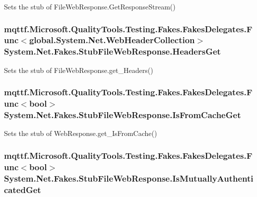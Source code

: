 Sets the stub of File\-Web\-Response.\-Get\-Response\-Stream()

\hypertarget{class_system_1_1_net_1_1_fakes_1_1_stub_file_web_response_a59b9b69af09e642aa18770bd201d79e0}{
\subsubsection[{Headers\-Get}]{\setlength{\rightskip}{0pt plus 5cm}mqttf.\-Microsoft.\-Quality\-Tools.\-Testing.\-Fakes.\-Fakes\-Delegates.\-Func$<$global.\-System.\-Net.\-Web\-Header\-Collection$>$ System.\-Net.\-Fakes.\-Stub\-File\-Web\-Response.\-Headers\-Get}}\label{class_system_1_1_net_1_1_fakes_1_1_stub_file_web_response_a59b9b69af09e642aa18770bd201d79e0}


Sets the stub of File\-Web\-Response.\-get\-\_\-\-Headers()

\hypertarget{class_system_1_1_net_1_1_fakes_1_1_stub_file_web_response_ae37937d3e34b41303d42dc02c9da123b}{
\subsubsection[{Is\-From\-Cache\-Get}]{\setlength{\rightskip}{0pt plus 5cm}mqttf.\-Microsoft.\-Quality\-Tools.\-Testing.\-Fakes.\-Fakes\-Delegates.\-Func$<$bool$>$ System.\-Net.\-Fakes.\-Stub\-File\-Web\-Response.\-Is\-From\-Cache\-Get}}\label{class_system_1_1_net_1_1_fakes_1_1_stub_file_web_response_ae37937d3e34b41303d42dc02c9da123b}


Sets the stub of Web\-Response.\-get\-\_\-\-Is\-From\-Cache()

\hypertarget{class_system_1_1_net_1_1_fakes_1_1_stub_file_web_response_a6c6a469839fda0b9bfec61235ccfc9fe}{
\subsubsection[{Is\-Mutually\-Authenticated\-Get}]{\setlength{\rightskip}{0pt plus 5cm}mqttf.\-Microsoft.\-Quality\-Tools.\-Testing.\-Fakes.\-Fakes\-Delegates.\-Func$<$bool$>$ System.\-Net.\-Fakes.\-Stub\-File\-Web\-Response.\-Is\-Mutually\-Authenticated\-Get}}\label{class_system_1_1_net_1_1_fakes_1_1_stub_file_web_response_a6c6a469839fda0b9bfec61235ccfc9fe}


